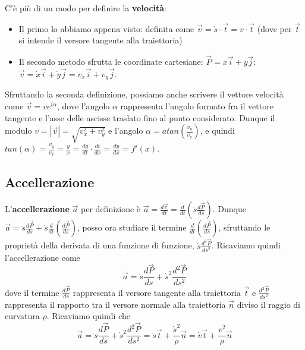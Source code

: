 \newline
C'è più di un modo per definire la \textbf{velocità}:
\begin{itemize}
    \item Il primo lo abbiamo appena visto: definita come $\vec{v} = \dot{s} \cdot \vec{t} = v \cdot \vec{t}$ (dove per $\vec{t}$ si intende il versore tangente alla traiettoria)
    \item Il secondo metodo sfrutta le coordinate cartesiane: $\vec{P} = x \vec{i} + y \vec{j}$: $\vec{v} = \dot{x} \vec{i} + \dot{y} \vec{j} = v_x \vec{i} + v_y \vec{j}$.
\end{itemize}
Sfruttando la seconda definizione, possiamo anche scrivere il vettore velocità come $\vec{v} = v e^{i \alpha}$, dove l'angolo $\alpha$ rappresenta l'angolo formato fra il vettore tangente e l'asse delle ascisse traslato fino al punto considerato. Dunque il modulo $v = |\vec{v}| = \sqrt{v_x^2 +v_y^2}$ e l'angolo $\alpha = atan\left(\frac{v_y}{v_x}\right)$, e quindi $tan(\alpha) = \frac{v_y}{v_x} = \frac{\dot{y}}{\dot{x}} = \frac{dy}{dt} \cdot \frac{dt}{dx} = \frac{dy}{dx} = f'(x)$.
\subsection{Accellerazione}
L'\textbf{accellerazione} $\vec{a}$ per definizione è $\vec{a} = \frac{d \vec{v}}{dt} = \frac{d}{dt}(\dot{s} \frac{d \vec{P}}{ds})$.\newline
Dunque $\vec{a} = \ddot{s} \frac{d \vec{P}}{ds} + \dot{s} \frac{d}{dt}\left(\frac{d \vec{P}}{ds}\right)$, posso ora studiare il termine $\frac{d}{dt}\left(\frac{d \vec{P}}{ds}\right)$, sfruttando le proprietà della derivata di una funzione di funzione, $\dot{s} \frac{d^2 \vec{P}}{ds^2}$.\newline
Ricaviamo quindi l'accellerazione come 
\[
    \vec{a} = \ddot{s} \frac{d \vec{P}}{ds} + \dot{s}^2 \frac{d^2 \vec{P}}{ ds^2}
\] 
dove il termine $\frac{d \vec{P}}{ds}$ rappresenta il versore tangente alla traiettoria $\vec{t}$ e $\frac{d^2 \vec{P}}{ ds^2}$ rappresenta il rapporto tra il versore normale alla traiettoria $\vec{n}$ diviso il raggio di curvatura $\rho$. Ricaviamo quindi che
\[
    \vec{a} = \ddot{s} \frac{d \vec{P}}{ds} + \dot{s}^2 \frac{d^2 \vec{P}}{ ds^2} = \ddot{s} \vec{t} + \frac{ \dot{s}^2}{\rho}\vec{n} = \dot{v} \vec{t} + \frac{v^2}{\rho}\vec{n}
\]
